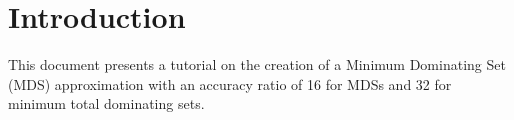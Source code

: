 \chapter{Introduction}\label{chap:baseline_introduction}
This document presents a tutorial on the creation of a Minimum Dominating Set (MDS) approximation with an accuracy ratio of 16 for MDSs and 32 for minimum total dominating sets.